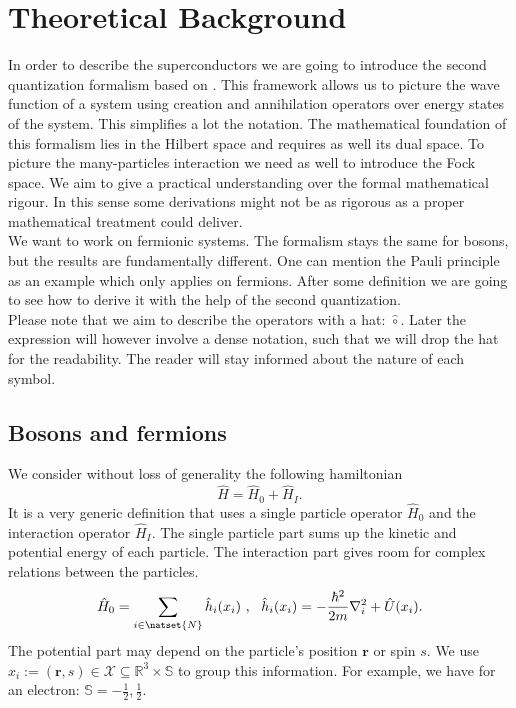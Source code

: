 \documentclass[../main.tex]{subfile}
\begin{document}
\section{Theoretical Background}
In order to describe the superconductors we are going to introduce the second quantization formalism based on \cite{Folk2014}.
This framework allows us to picture the wave function of a system using creation and annihilation operators over
energy states of the system. This simplifies a lot the notation. The mathematical foundation of this formalism lies
in the Hilbert space and requires as well its dual space. To picture the many-particles interaction we need as well
to introduce the Fock space. We aim to give a practical understanding over the formal mathematical rigour.
In this sense some derivations might not be as rigorous as a proper mathematical treatment could deliver.\\

We want to work on fermionic systems. The formalism stays the same for 
bosons, but the results are fundamentally different. One can mention the Pauli principle as an example which
only applies on fermions. After some definition we are going to see how to derive it with the help of the second quantization.\\ 

Please note that we aim to describe the operators with a hat: $\hat{\circ}$.
Later the expression will however involve a dense notation, such that we will drop the hat for the readability. The reader will stay
informed about the nature of each symbol. \\

\subsection{Bosons and fermions}
We consider without loss of generality the following hamiltonian
\begin{equation}\label{eq:MasterHamiltonian}
    \hat{H} = \hat{H}_0 + \hat{H}_I.
\end{equation}
It is a very generic definition that uses a single particle operator $\hat{H}_0$ and the interaction operator $\hat{H}_I$. The single 
particle part sums up the kinetic and potential energy of each particle. The interaction part gives room for complex relations
between the particles.\\ 
\[
    \hat{H}_0 = \sum_{i\in \natset{N}} \hat{h}_i(x_i)~,~~ \hat{h}_i(x_i) = -\frac{\hbar^2}{2m}\nabla_i^2 + \hat{U}(x_i).
\]
The potential part may depend on the particle's position $\bm{r}$ or spin $s$. 
We use $x_i := (\bm{r}, s) \in \mathcal{X}\subseteq\mathbb{R}^{3}\times\mathbb{S}$ to group this information. For example, we have for an electron:
$\mathbb{S}= {-\frac{1}{2},\frac{1}{2}}$.\\
\end{document}
